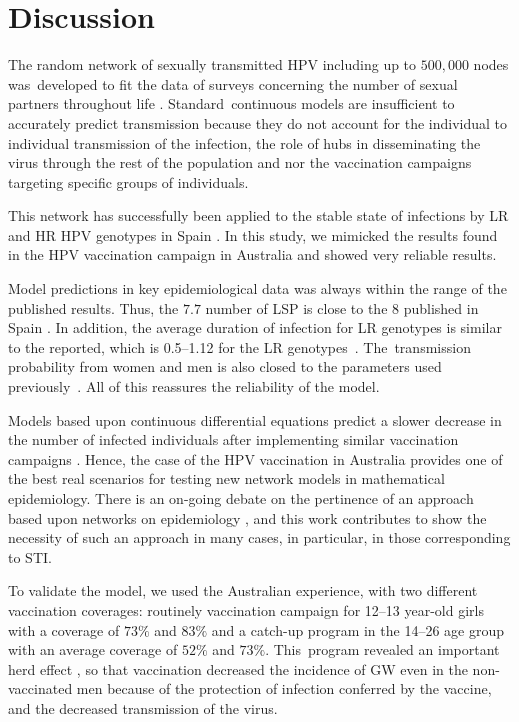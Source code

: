 \section{Discussion}

The random network of sexually transmitted HPV including up to $500,000$ nodes was~developed to fit the data of surveys concerning the number of sexual partners throughout life \cite{Calibrate,Network}. Standard~continuous models are insufficient to accurately predict transmission because they do not account for the individual to individual transmission of the infection, the role of hubs in disseminating the virus through the rest of the population and {nor} 
the vaccination campaigns targeting specific groups of individuals.

This network has successfully been applied to the stable state of infections by LR and HR HPV genotypes in Spain  \cite{Calibrate}. In this study, we mimicked the results found in the HPV vaccination campaign in Australia \cite{Fairley,Ali} and showed very reliable results. 

Model predictions in key epidemiological data was always within the range of the published results. Thus, the $7.7$ number of LSP is close to the $8$ published in Spain \cite{Durex}. In addition, the average duration of infection for LR genotypes is similar to the reported, which is 0.5--1.12 for the LR genotypes~\mbox{\cite{Elbasha1,HPV,Nytray}}. The~transmission probability from women and men is also closed to the parameters used previously~\mbox{\cite{Elbasha1,Nytray}}. All of this reassures the reliability of the model.

Models based upon continuous differential equations predict a slower decrease in the number of infected individuals after implementing similar vaccination campaigns \cite{Elbasha1,Elbasha2}. Hence, the case of the HPV vaccination in Australia provides one of the best real scenarios for testing new network models in mathematical epidemiology. There is an on-going debate on the pertinence of an approach based upon networks on epidemiology \cite{Eubank}, and this work contributes to show the necessity of such an approach in many cases, in particular, in those corresponding to STI.

To validate the model, we used the Australian experience, with two different vaccination coverages: routinely vaccination campaign for 12--13 year-old girls with a coverage of $73\%$ and $83\%$ and a catch-up program in the 14--26 age group with an average coverage of $52\%$ and $73\%$. This~program revealed an important herd effect \cite{Ali}, so that vaccination decreased the incidence of GW even in the non-vaccinated men because of the protection of infection conferred by the vaccine, and the decreased transmission of the virus.


